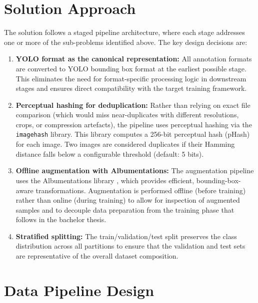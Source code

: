 \documentclass[a4paper,12pt,twoside]{report}
\begin{document}
\section{Solution Approach}
\label{sec:solution-approach}

The solution follows a staged pipeline architecture, where each stage addresses
one or more of the sub-problems identified above. The key design decisions are:

\begin{enumerate}
  \item \textbf{YOLO format as the canonical representation:} All annotation
    formats are converted to YOLO bounding box format at the earliest possible
    stage. This eliminates the need for format-specific processing logic in
    downstream stages and ensures direct compatibility with the target training
    framework.

  \item \textbf{Perceptual hashing for deduplication:} Rather than relying on
    exact file comparison (which would miss near-duplicates with different
    resolutions, crops, or compression artefacts), the pipeline uses perceptual
    hashing via the \texttt{imagehash} library. This library
    computes a 256-bit perceptual hash (pHash) for each image. Two images are
    considered duplicates if their Hamming distance falls below a configurable
    threshold (default: 5 bits).

  \item \textbf{Offline augmentation with Albumentations:} The augmentation
    pipeline uses the Albumentations library \citep{buslaev2020albumentations},
    which provides efficient, bounding-box-aware transformations. Augmentation is
    performed offline (before training) rather than online (during training) to
    allow for inspection of augmented samples and to decouple data preparation
    from the training phase that follows in the bachelor thesis.

  \item \textbf{Stratified splitting:} The train/validation/test split preserves
    the class distribution across all partitions to ensure that the validation
    and test sets are representative of the overall dataset composition.
\end{enumerate}

\section{Data Pipeline Design}
\label{sec:pipeline-design}
\end{document}
